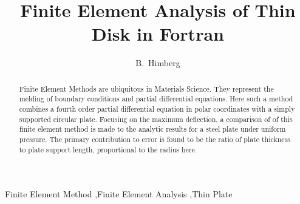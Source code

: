 \documentclass[12pt,times,twocolumn,3p]{elsarticle}
\begin{document}
\begin{frontmatter}



\title{Finite Element Analysis of Thin Disk in Fortran}


\author{B.~Himberg}

\address{}

\begin{abstract}
Finite Element Methods are ubiquitous in Materials Science. They represent the
melding of boundary conditions and partial differential equations. Here such a
method combines a fourth order partial differential equation in polar coordinates
with a simply supported circular plate. Focusing on the maximum deflection, a
comparison of of this finite element method is made to the analytic results for
a steel plate under uniform pressure. The primary contribution to error is found
to be the ratio of plate thickness to plate support length, proportional to the
radius here.

\end{abstract}

\begin{keyword}
Finite Element Method \sep Finite Element Analysis \sep Thin Plate



\end{keyword}

\end{frontmatter}
\end{document}
